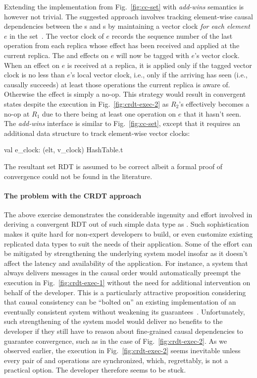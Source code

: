 Extending the  implementation from Fig.~\ref{fig:cc-set} with
\emph{add-wins} semantics is however not trivial. The suggested
approach involves tracking element-wise causal dependencies between
the s and s by maintaining a vector clock \emph{for
each element} $e$ in the set~\cite{zawirski-thesis}. The vector clock
of $e$ records the sequence number of the last  operation
from each replica whose effect has been received and applied at the
current replica. The  and  effects on $e$ will now be
tagged with $e$'s vector clock. When an  effect on $e$ is
received at a replica, it is applied only if the tagged vector clock
is no less than $e$'s local vector clock, i.e., only if the arriving
 has seen (i.e., causally succeeds) at least those
 operations the current replica is aware of.  Otherwise
the effect is simply a no-op. This strategy would result in convergent
states despite the execution in Fig.~\ref{fig:crdt-exec-2} as $R_2$'s
 effectively becomes a no-op at $R_1$ due to there being at
least one  operation on $e$ that it hasn't seen. The
\emph{add-wins}  interface is similar to Fig.~\ref{fig:cc-set},
except that it requires an additional data structure to track
element-wise vector clocks: 
\begin{ocaml}
  val e_clock: (elt, v_clock) HashTable.t
\end{ocaml}
The resultant set RDT is assumed to be correct albeit a formal proof
of convergence could not be found in the literature. 

\noindent\paragraph{The problem with the CRDT approach} The above
exercise demonstrates the considerable ingenuity and effort involved
in deriving a convergent RDT out of such simple data type as .
Such sophistication makes it quite hard for non-expert developers to
build, or even customize existing replicated data types to suit the
needs of their application. Some of the effort can be mitigated by
strengthening the underlying system model insofar as it doesn't affect
the latency and availability of the application. For instance, a
system that always delivers messages in the causal order would
automatically preempt the execution in Fig.~\ref{fig:crdt-exec-1}
without the need for additional intervention on behalf of the
developer. This is a particularly attractive proposition considering
that causal consistency can be ``bolted on'' an existing
implementation of an eventually consistent system without weakening
its guarantees~\cite{BoltOn}. Unfortunately, such strengthening of the
system model would deliver no benefits to the developer if they still
have to reason about fine-grained causal dependencies to guarantee
convergence, such as in the case of Fig.~\ref{fig:crdt-exec-2}. As we
observed earlier, the execution in Fig.~\ref{fig:crdt-exec-2} seems
inevitable unless every pair of  and  operations are
synchronized, which, regrettably, is not a practical option. The
developer therefore seems to be stuck.

